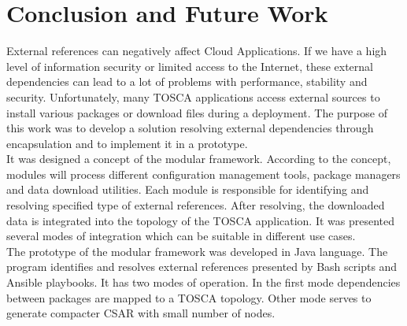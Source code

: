 
\chapter{Conclusion and Future Work}\label{chap:zusfas}
External references can negatively affect  Cloud Applications.
If we have a high level of information security or limited access to the Internet, these external dependencies can lead to a lot of problems with performance, stability and security.
Unfortunately, many TOSCA applications access external sources to install various packages or download files during a deployment.
The purpose of this work was to develop a solution resolving external dependencies through encapsulation and to implement it in a prototype.\\
It was designed a concept of the modular framework. 
According to the concept, modules will process different configuration management tools, package managers and data download utilities. 
Each module is responsible for identifying and resolving specified type of external references. 
After resolving, the downloaded data is integrated into the topology of the TOSCA application.
It was presented several modes of integration which can be suitable in different use cases.\\
The prototype of the modular framework was developed in Java language.
The program identifies and resolves external references presented by Bash scripts and Ansible playbooks.
It has two modes of operation.
In the first mode dependencies between packages are mapped to a TOSCA topology. 
Other mode serves to generate compacter CSAR with small number of nodes. %
